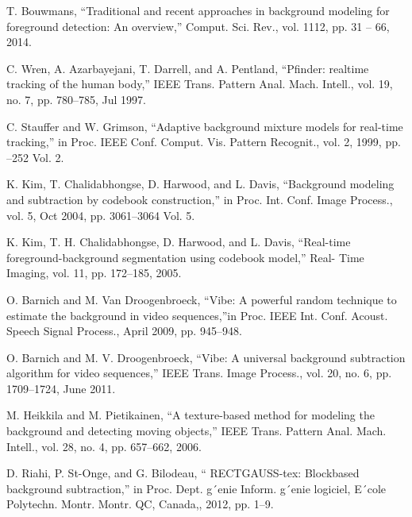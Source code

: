 \documentclass[runningheads,a4paper]{llncs}
\begin{document}
\begin{thebibliography}{4}


 T. Bouwmans, “Traditional and recent approaches in
    background modeling for foreground detection: An overview,” Comput. Sci.
        Rev., vol. 1112, pp. 31 – 66, 2014.

 C. Wren, A. Azarbayejani, T. Darrell, and A.
    Pentland, “Pfinder: realtime tracking of the human body,” IEEE Trans.             %
        Pattern Anal. Mach. Intell., vol. 19, no. 7, pp. 780–785, Jul 1997.

 C. Stauffer and W. Grimson, “Adaptive background
    mixture models for real-time tracking,” in Proc. IEEE Conf. Comput. Vis.    %
        Pattern Recognit., vol. 2, 1999, pp. –252 Vol. 2.

 K. Kim, T. Chalidabhongse, D. Harwood, and L.
    Davis, “Background modeling and subtraction by codebook construction,” in   %
        Proc. Int. Conf. Image Process., vol. 5, Oct 2004, pp. 3061–3064 Vol.
        5.

 K. Kim, T. H. Chalidabhongse, D. Harwood, and L.
    Davis, “Real-time foreground-background segmentation using codebook model,”	%
        Real- Time Imaging, vol. 11, pp. 172–185, 2005.

 O. Barnich and M. Van Droogenbroeck, “Vibe: A
    powerful random technique to estimate the background in video sequences,”in      %
        Proc. IEEE Int. Conf. Acoust. Speech Signal Process., April 2009, pp.
        945–948.

 O. Barnich and M. V. Droogenbroeck, “Vibe: A universal
    background subtraction algorithm for video sequences,” IEEE Trans. Image	        %
        Process., vol. 20, no. 6, pp. 1709–1724, June 2011.

 M. Heikkila and M. Pietikainen, “A texture-based
    method for modeling the background and detecting moving objects,” IEEE                %
        Trans. Pattern Anal. Mach. Intell., vol. 28, no. 4, pp. 657–662, 2006.

 D. Riahi, P. St-Onge, and G. Bilodeau, “
    RECTGAUSS-tex: Blockbased background subtraction,” in Proc. Dept. g´enie
        Inform. g´enie logiciel, E´cole Polytechn. Montr. Montr. QC, Canada,,
        2012, pp. 1–9.


\end{thebibliography}
\end{document}

